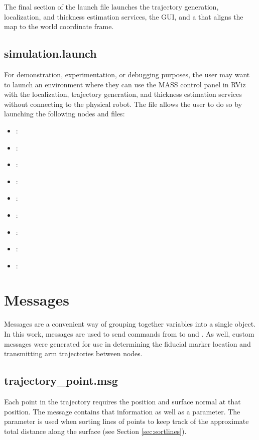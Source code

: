 The final section of the launch file launches the trajectory generation, localization, and thickness estimation services, the  GUI, and a  that aligns the map to the world coordinate frame.\\

\subsection{simulation.launch}

For demonstration, experimentation, or debugging purposes, the user may want to launch an environment where they can use the MASS control panel in RViz with the localization, trajectory generation, and thickness estimation services without connecting to the physical robot. The  file allows the user to do so by launching the following nodes and files:

\begin{itemize}

\item {} : 
\item {} : 
\item {} : 
\item {} : 
\item {} : 
\item {} : 
\item {} : 
\item {} : 
\item {} : 
\end{itemize}

\section{Messages}

Messages are a convenient way of grouping together variables into a single object. In this work, messages are used to send commands from  to  and . As well, custom messages were generated for use in determining the fiducial marker location and transmitting arm trajectories between nodes.\\

\subsection{trajectory\_point.msg}
Each point in the trajectory requires the position and surface normal at that position. The  message contains that information as well as a  parameter. The  parameter is used when sorting lines of points to keep track of the approximate total distance along the surface (see Section \ref{sec:sortlines}).\\
